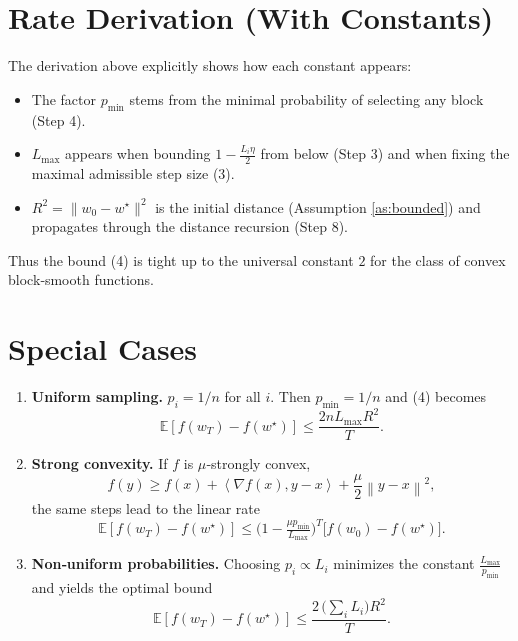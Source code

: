 \documentclass[11pt]{article}
\newcommand{\E}{\mathbb{E}}
\newcommand{\norm}[1]{\left\|#1\right\|}
\newcommand{\inner}[2]{\left\langle #1,#2 \right\rangle}
\begin{document}
\section*{Rate Derivation (With Constants)}
The derivation above explicitly shows how each constant appears:

\begin{itemize}
    \item The factor $p_{\min}$ stems from the minimal probability of selecting any block (Step 4).
    \item $L_{\max}$ appears when bounding $1-\frac{L_i\eta}{2}$ from below (Step 3) and when fixing the maximal admissible step size (3).
    \item $R^{2}= \|w_0-w^\star\|^{2}$ is the initial distance (Assumption \ref{as:bounded}) and propagates through the distance recursion (Step 8).
\end{itemize}
Thus the bound (4) is tight up to the universal constant $2$ for the class of convex block‑smooth functions.

\section*{Special Cases}
\begin{enumerate}
    \item \textbf{Uniform sampling.} $p_i=1/n$ for all $i$. Then $p_{\min}=1/n$ and (4) becomes
          \[
          \E[f(w_T)-f(w^\star)]\le \frac{2nL_{\max}R^{2}}{T}.
          \]
    \item \textbf{Strong convexity.} If $f$ is $\mu$‑strongly convex,
          \[
          f(y)\ge f(x)+\inner{\nabla f(x)}{y-x}+\frac{\mu}{2}\norm{y-x}^{2},
          \]
          the same steps lead to the linear rate
          \[
          \E[f(w_T)-f(w^\star)]\le\bigl(1-\tfrac{\mu p_{\min}}{L_{\max}}\bigr)^{T}
               \bigl[f(w_0)-f(w^\star)\bigr].
          \]
    \item \textbf{Non‑uniform probabilities.} Choosing $p_i\propto L_i$ minimizes the constant
          $\frac{L_{\max}}{p_{\min}}$ and yields the optimal bound
          \[
          \E[f(w_T)-f(w^\star)]\le \frac{2\,\bigl(\sum_i L_i\bigr)R^{2}}{T}.
          \]
\end{enumerate}
\end{document}
